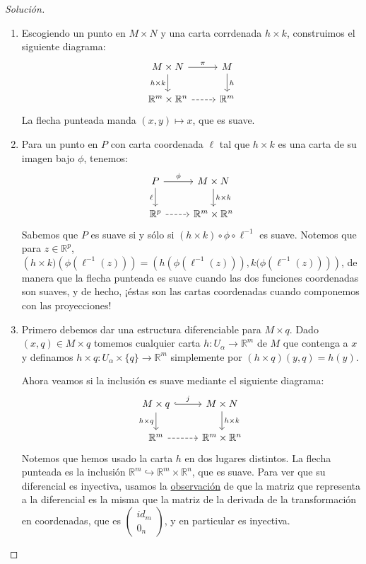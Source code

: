 \documentclass[spanish]{book}
\theoremstyle{definition}
\newcommand{\R}{\mathbb{R}}
\begin{document}
	\begin{proof}[Solución]\leavevmode
		\begin{enumerate}
			\item Escogiendo un punto en $M\times N$ y una carta corrdenada $h\times k$, construimos el siguiente diagrama:
			\[\begin{tikzcd}
				M\times N\arrow{r}{\pi}\arrow[swap]{d}{h\times k}&M\arrow{d}{h}\\
				\R^m\times\R^n\arrow[dashed]{r}&\R^m
			\end{tikzcd}\]
			La flecha punteada manda $(x,y)\mapsto x$, que es suave.
			\item Para un punto en $P$ con carta coordenada $\ell$ tal que $h\times k$ es una carta de su imagen bajo $\phi$, tenemos:
			\[\begin{tikzcd}
				P\arrow{r}{\phi}\arrow[swap]{d}{\ell}&M\times N\arrow{d}{h\times k}\\
				\R^p\arrow[dashed]{r}&\R^m\times\R^n
			\end{tikzcd}\]
			Sabemos que $P$ es suave si y sólo si $(h\times k)\circ\phi\circ\ell^{-1}$ es suave.  Notemos que para $z\in\R^p$, $\left(h\times k)\left(\phi\left(\ell^{-1}(z)\right)\right)=\left(h\left(\phi\left(\ell^{-1}(z)\right)\right),k(\phi\left(\ell^{-1}(z)\right)\right)\right)$, de manera que la flecha punteada es suave cuando las dos funciones coordenadas son suaves, y de hecho, ¡éstas son las cartas coordenadas cuando componemos con las proyecciones!
			\item Primero debemos dar una estructura diferenciable para $M\times q$. Dado $(x,q)\in M\times q$ tomemos cualquier carta  $h:U_\alpha\to\R^m$ de $M$ que contenga a $x$ y definamos ${h\times q:U_\alpha\times\{q\}\to\R^m}$ simplemente por $(h\times q)(y,q)=h(y)$.
			
			Ahora veamos si la inclusión es suave mediante el siguiente diagrama:
			\[\begin{tikzcd}
				M\times q\arrow[hook]{r}{j}\arrow[swap]{d}{h\times q}&M\times N\arrow{d}{h\times k}\\
				\R^m\arrow[dashed]{r}&\R^m\times\R^n
			\end{tikzcd}\]
			Notemos que hemos usado la carta $h$ en dos lugares distintos. La flecha punteada es la inclusión $\R^m\hookrightarrow\R^m\times\R^n$, que es suave. Para ver que su diferencial es inyectiva, usamos la \hyperref[obs:dif-mat]{observación} de que la matriz que representa a la diferencial es la misma que la matriz de la derivada de la transformación en coordenadas, que es $\begin{pmatrix}
				id_{m}\\0_{n}
			\end{pmatrix}$, y en particular es inyectiva.
			

\end{enumerate}
\end{proof}
\end{document}
